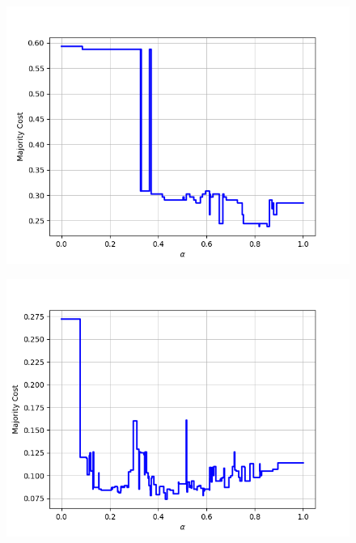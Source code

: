 \begin{figure}[h]\ContinuedFloat
\centering
\begin{minipage}{.24\textwidth}
  \centering
  {\includegraphics[width=\linewidth]{plots/nell-ac/mediacompany}}
\end{minipage}
\begin{minipage}{.24\textwidth}
  \centering
  {\includegraphics[width=\linewidth]{plots/nell-ac/organization}}
\end{minipage}
\begin{minipage}{.24\textwidth}
  \centering

\end{minipage}
\end{figure}
